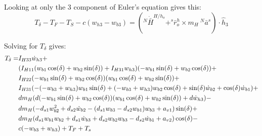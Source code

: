 \documentclass[]{article}
\begin{document}
Looking at only the 3 component of Euler's equation gives this:
\begin{equation}
    T_\delta - T_F - T_S - c(w_{h3} - w_{b3}) = (^N\dot{\bar{H}}^{H/h_o} + ^s\bar{r}^h_o \times m_H
    \ ^N\bar{a}^s)
 \cdot \hat{h}_3
\end{equation}

Solving for $T_\delta$ gives:
\begin{align}
  T_{\delta} = &
  I_{H33} \dot{w}_{h3} + \\\notag
  & (I_{H11} (w_{b1}\cos(\delta) +
  w_{b2}\sin(\delta)) +
  I_{H31} w_{h3}) (-w_{b1}\sin(\delta) +
  w_{b2}\cos(\delta)) + \\\notag
  & I_{H22} (- w_{b1} \sin(\delta) +
  w_{b2}\cos(\delta))
  (w_{b1}\cos(\delta) +
  w_{b2}\sin(\delta)) + \\\notag
  & I_{H31} (- (- w_{b3} + w_{h3}) w_{b1}
  \sin(\delta) +
  (-w_{b3} + w_{h3})
  w_{b2}\cos(\delta) +
  \sin(\delta)\dot{w}_{b2} +
  \cos(\delta)\dot{w}_{b1}) +\\\notag
  & d m_H (d (-w_{b1}\sin(\delta) + w_{b2}
  \cos(\delta))(w_{b1}\cos(\delta) +
  w_{b2}\sin(\delta)) +
  d \dot{w}_{h3}) - \\\notag
  & d m_H (- d_{s1} w_{b2}^{2} + d_{s2}
  \dot{w}_{b2} - (d_{s1}
  w_{b3} - d_{s2}
  w_{b1}) w_{b3} +
  a_{v1})
  \sin(\delta) +\\\notag
  & d m_H(d_{s1} w_{b1}w_{b2} +
  d_{s1} \dot{w}_{b3} +
  d_{s2} w_{b2} w_{b3} - d_{s2} \dot{w}_{b1} +
  a_{v2})\cos(\delta) - \\\notag
  & c (- w_{b3} + w_{h3}) + T_F + T_s
\end{align}
\end{document}
